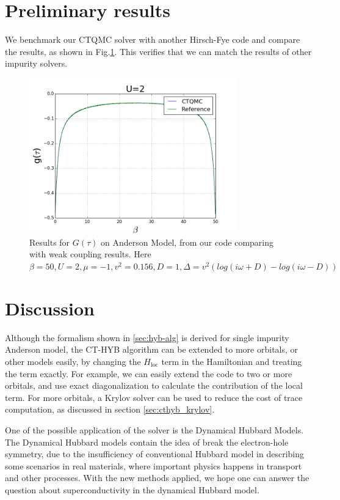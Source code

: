 
\section{Preliminary results}
We benchmark our CTQMC solver with another Hirsch-Fye code and compare the results,
as shown in Fig.\ref{fig:u2}. This verifies that we can match the results of 
other impurity solvers.

\begin{figure}
  \centering
  \label{fig:u2}
  \includegraphics[width=0.8\textwidth] {img/U=2.png}
  \caption{Results for $G(\tau)$ on Anderson Model, from our code comparing with
weak coupling results.
Here $\beta = 50, U = 2, \mu = −1, v^2 = 0.156, D = 1, \Delta = v^2(log(i\omega + D) − log(i\omega − D))$}
\end{figure}



\section{Discussion\label{sec:hyb-concl}}

Although the formalism shown in \ref{sec:hyb-alg} is derived for single 
impurity Anderson model, the CT-HYB algorithm can be extended to more orbitals,
or other models easily, by changing the $H_\textrm{loc}$ term in the Hamiltonian 
and treating the term exactly. For example, we can easily extend the code to two or more
orbitals, and use exact diagonalization to calculate the contribution of the 
local term. For more orbitals, a Krylov solver\cite{PhysRevB.80.235117} can be used to reduce the cost of
trace computation, as discussed in section \ref{sec:cthyb_krylov}.

One of the possible application of the solver is the Dynamical Hubbard Models. 
The Dynamical Hubbard models contain the idea of break the electron-hole 
symmetry, due to the insufficiency of conventional Hubbard model in describing 
some scenarios in real materials, where important physics happens in transport 
and other processes. With the new methods applied, we hope one can answer the question 
about superconductivity in the dynamical Hubbard model. 

